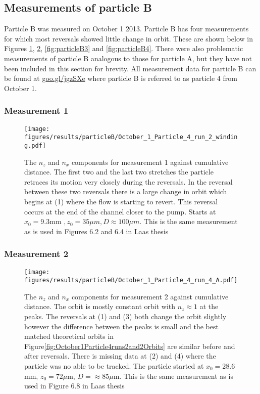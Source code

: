 \subsection{Measurements of particle B}
Particle B was measured on October 1 2013. Particle B has four measurements for which most reversals showed little change in orbit. These are shown below in Figures \ref{fig:particleB1}, \ref{fig:particleB2}, \ref{fig:particleB3} and \ref{fig:particleB4}. There were also problematic measurements of particle B analogous to those for particle A, but they have not been included in this section for brevity. All measurement data for particle B can be found at \url{goo.gl/jgzSXe} where particle B is referred to as particle 4 from October 1. 

\subsubsection{Measurement 1}
\begin{figure}[H]
\begin{center}
\texttt{[image: figures/results/particleB/October\_1\_Particle\_4\_run\_2\_winding.pdf]}
\end{center}
\caption{The $n_z$ and $n_x$ components for measurement 1 against cumulative distance. The first two and the last two stretches the particle retraces its motion very closely during the reversals. In the reversal between these two reversals there is a large change in orbit which begins at (1) where the flow is starting to revert. This reversal occurs at the end of the channel closer to the pump. Starts at $ x_0 = 9.3$mm $,z_0 = 35\mu m, D \approx 100\mu m$. This is the same measurement as is used in Figures 6.2 and 6.4 in Laas thesis~\cite{alexanderThesis}}
\label{fig:particleB1}
\end{figure}
	


\subsubsection{Measurement 2}

\begin{figure}[H]
\begin{center}
\texttt{[image: figures/results/particleB/October\_1\_Particle\_4\_run\_4\_A.pdf]}
\end{center}
\caption{The $n_z$ and $n_x$ components for measurement 2 against cumulative distance. The orbit is mostly constant orbit with $n_z \approx 1$ at the peaks. The reversals at (1) and (3) both change the orbit slightly however the difference between the peaks is small and the best matched theoretical orbits in Figure\ref{fig:October1Particle4runs2and2Orbits} are similar before and after reversals. There is missing data at (2) and (4) where the particle was no able to be tracked. The particle started at $x_0 = 28.6$mm, $z_0 = 72\mu$m, $D = \approx 85\mu$m. This is the same measurement as is used in Figure 6.8 in Laas thesis~\cite{alexanderThesis}}
\label{fig:particleB2}
\end{figure}

